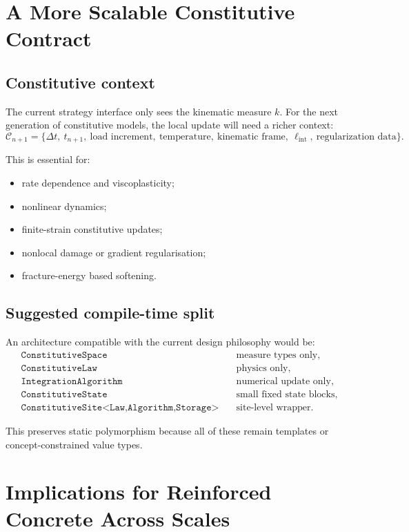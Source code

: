 \section{A More Scalable Constitutive Contract}

\subsection{Constitutive context}

The current strategy interface only sees the kinematic measure \(k\).  For the
next generation of constitutive models, the local update will need a richer
context:
\[
\mathcal{C}_{n+1}
=
\{\Delta t,\ t_{n+1},\ \text{load increment},\ \text{temperature},
\ \text{kinematic frame},\ \ell_\text{int},\ \text{regularization data}\}.
\]

This is essential for:
\begin{itemize}
  \item rate dependence and viscoplasticity;
  \item nonlinear dynamics;
  \item finite-strain constitutive updates;
  \item nonlocal damage or gradient regularisation;
  \item fracture-energy based softening.
\end{itemize}

\subsection{Suggested compile-time split}

An architecture compatible with the current design philosophy would be:
\begin{align*}
\texttt{ConstitutiveSpace}
&\quad \text{measure types only},\\
\texttt{ConstitutiveLaw}
&\quad \text{physics only},\\
\texttt{IntegrationAlgorithm}
&\quad \text{numerical update only},\\
\texttt{ConstitutiveState}
&\quad \text{small fixed state blocks},\\
\texttt{ConstitutiveSite<Law,Algorithm,Storage>}
&\quad \text{site-level wrapper}.
\end{align*}

This preserves static polymorphism because all of these remain templates or
concept-constrained value types.

\section{Implications for Reinforced Concrete Across Scales}

